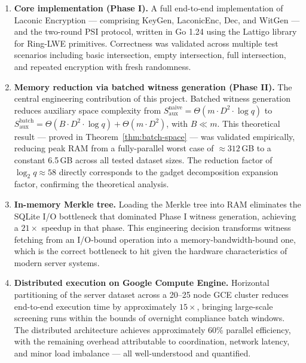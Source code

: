 \begin{enumerate}
    \item \textbf{Core implementation (Phase I).} A full end-to-end implementation
          of Laconic Encryption --- comprising \textsf{KeyGen}, \textsf{LaconicEnc}, \textsf{Dec},
          and \textsf{WitGen} --- and the two-round PSI protocol, written in Go 1.24
          using the Lattigo library for Ring-LWE primitives. Correctness was validated
          across multiple test scenarios including basic intersection, empty intersection,
          full intersection, and repeated encryption with fresh randomness.

    \item \textbf{Memory reduction via batched witness generation (Phase II).} The
          central engineering contribution of this project. Batched witness generation
          reduces auxiliary space complexity from $S_{\text{aux}}^{\text{naive}} = \Theta(m \cdot D^2 \cdot \log q)$
          to $S_{\text{aux}}^{\text{batch}} = \Theta(B \cdot D^2 \cdot \log q) + \Theta(m \cdot D^2)$,
          with $B \ll m$. This theoretical result --- proved in Theorem~\ref{thm:batch-space} ---
          was validated empirically, reducing peak RAM from a fully-parallel worst
          case of $\approx 312$\,GB to a constant 6.5\,GB across all tested dataset
          sizes. The reduction factor of $\log_2 q \approx 58$ directly corresponds
          to the gadget decomposition expansion factor, confirming the theoretical analysis.

    \item \textbf{In-memory Merkle tree.} Loading the Merkle tree into RAM eliminates
          the SQLite I/O bottleneck that dominated Phase I witness generation,
          achieving a $21\times$ speedup in that phase. This engineering decision
          transforms witness fetching from an I/O-bound operation into a memory-bandwidth-bound
          one, which is the correct bottleneck to hit given the hardware characteristics
          of modern server systems.

    \item \textbf{Distributed execution on Google Compute Engine.} Horizontal
          partitioning of the server dataset across a 20--25 node GCE cluster reduces
          end-to-end execution time by approximately $15\times$, bringing large-scale
          screening runs within the bounds of overnight compliance batch windows. The
          distributed architecture achieves approximately 60\% parallel efficiency,
          with the remaining overhead attributable to coordination, network latency,
          and minor load imbalance --- all well-understood and quantified.


\end{enumerate}
